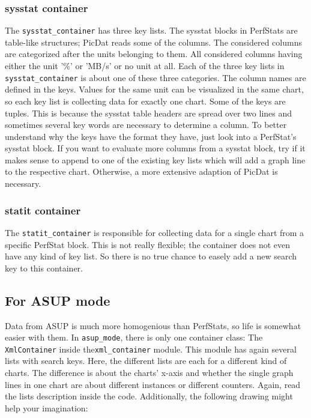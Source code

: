 \documentclass[a4paper,11pt]{article}
\begin{document}
\subsubsection*{sysstat container}
The \verb|sysstat_container| has three key lists. The sysstat blocks in PerfStats are table-like structures; PicDat reads some of the columns. The considered columns are categorized after the units belonging to them. All considered columns having either the unit '\%' or 'MB/s' or no unit at all. Each of the three key lists in \verb|sysstat_container| is about one of these three categories. The column names are defined in the keys. Values for the same unit can be visualized in the same chart, so each key list is collecting data for exactly one chart. Some of the keys are tuples. This is because the sysstat table headers are spread over two lines and sometimes several key words are necessary to determine a column. To better understand why the keys have the format they have, just look into a PerfStat's sysstat block. If you want to evaluate more columns from a sysstat block, try if it makes sense to append to one of the existing key lists which will add a graph line to the respective chart. Otherwise, a more extensive adaption of PicDat is necessary.

\subsubsection*{statit container}
The \verb|statit_container| is responsible for collecting data for a single chart from a specific PerfStat block. This is not really flexible; the container does not even have any kind of key list. So there is no true chance to easely add a new search key to this container.

\subsection*{For ASUP mode}
Data from ASUP is much more homogenious than PerfStats, so life is somewhat easier with them. In \verb|asup_mode|, there is only one container class: The \verb|Xml|\verb|Container| inside the\break\verb|xml_container| module. This module has again several lists with search keys. Here, the different lists are each for a different kind of charts. The difference is about the charts' x-axis and whether the single graph lines in one chart are about different instances or different counters. Again, read the lists description inside the code. Additionally, the following drawing might help your imagination:
\end{document}
